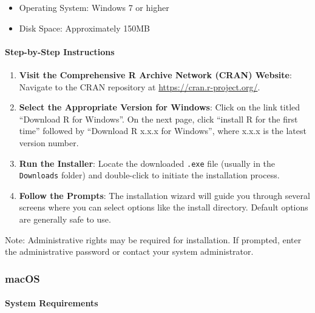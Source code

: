 \documentclass[
]{book}
\newenvironment{Shaded}{\begin{snugshade}}{\end{snugshade}}
\newcommand{\NormalTok}[1]{#1}
\providecommand{\tightlist}{%
  \setlength{\itemsep}{0pt}\setlength{\parskip}{0pt}}
\begin{document}
\begin{itemize}
\tightlist
\item
  Operating System: Windows 7 or higher
\item
  Disk Space: Approximately 150MB
\end{itemize}

\hypertarget{step-by-step-instructions}{%
\paragraph*{Step-by-Step Instructions}\label{step-by-step-instructions}}

\begin{enumerate}
\def\labelenumi{\arabic{enumi}.}
\item
  \textbf{Visit the Comprehensive R Archive Network (CRAN) Website}: Navigate to the CRAN repository at \url{https://cran.r-project.org/}.
\item
  \textbf{Select the Appropriate Version for Windows}: Click on the link titled ``Download R for Windows''. On the next page, click ``install R for the first time'' followed by ``Download R x.x.x for Windows'', where x.x.x is the latest version number.
\item
  \textbf{Run the Installer}: Locate the downloaded \texttt{.exe} file (usually in the \texttt{Downloads} folder) and double-click to initiate the installation process.
\item
  \textbf{Follow the Prompts}: The installation wizard will guide you through several screens where you can select options like the install directory. Default options are generally safe to use.
\end{enumerate}

\begin{Shaded}
\begin{Highlighting}[]
\NormalTok{Note: Administrative rights may be required for installation. If prompted, enter the administrative password or contact your system administrator.}
\end{Highlighting}
\end{Shaded}

\hypertarget{macos}{%
\subsubsection*{macOS}\label{macos}}

\hypertarget{system-requirements-1}{%
\paragraph*{System Requirements}\label{system-requirements-1}}
\end{document}
